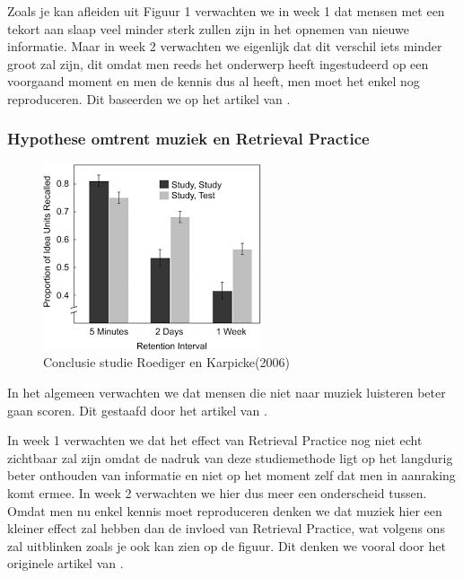 \documentclass{hogent-article}
\begin{document}
Zoals je kan afleiden uit Figuur 1 verwachten we in week 1 dat mensen met een tekort aan slaap veel minder sterk zullen zijn in het opnemen van nieuwe informatie. Maar in week 2 verwachten we eigenlijk dat dit verschil iets minder groot zal zijn, dit omdat men reeds het onderwerp heeft ingestudeerd op een voorgaand moment en men de kennis dus al heeft, men moet het enkel nog reproduceren. Dit baseerden we op het artikel van \textcite{Potkin2012}.


\subsubsection{Hypothese omtrent muziek en Retrieval Practice}

\begin{figure}[H]
	\includegraphics[width=0.8\linewidth]{hypotheseGraph2}
    \caption{Conclusie studie Roediger en Karpicke(2006)}
\end{figure}

In het algemeen verwachten we dat mensen die niet naar muziek luisteren beter gaan scoren. Dit gestaafd door het artikel van \textcite{Dolegui2013}.\\
\par
\noindent
In week 1 verwachten we dat het effect van Retrieval Practice nog niet echt zichtbaar zal zijn omdat de nadruk van deze studiemethode ligt op het langdurig beter onthouden van informatie en niet op het moment zelf dat men in aanraking komt ermee.
In week 2 verwachten we hier dus meer een onderscheid tussen. Omdat men nu enkel kennis moet reproduceren denken we dat muziek hier een kleiner effect zal hebben dan de invloed van Retrieval Practice, wat volgens ons zal uitblinken zoals je ook kan zien op de figuur. Dit denken we vooral door het originele artikel van \textcite{Roediger2006}.
\end{document}
